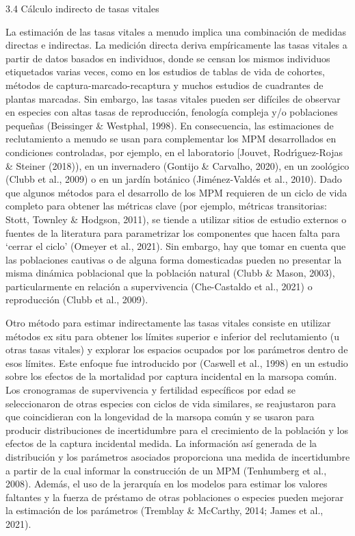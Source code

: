 \documentclass[
  12pt,
  letterpaper,
]{book}
\begin{document}
3.4 \textbar{} Cálculo indirecto de tasas vitales

La estimación de las tasas vitales a menudo implica una combinación de
medidas directas e indirectas. La medición directa deriva empíricamente
las tasas vitales a partir de datos basados en individuos, donde se
censan los mismos individuos etiquetados varias veces, como en los
estudios de tablas de vida de cohortes, métodos de
captura-marcado-recaptura y muchos estudios de cuadrantes de plantas
marcadas. Sin embargo, las tasas vitales pueden ser difíciles de
observar en especies con altas tasas de reproducción, fenología compleja
y/o poblaciones pequeñas (Beissinger \& Westphal, 1998). En
consecuencia, las estimaciones de reclutamiento a menudo se usan para
complementar los MPM desarrollados en condiciones controladas, por
ejemplo, en el laboratorio {[}Jouvet, Rodrı́guez-Rojas \& Steiner
(2018)), en un invernadero (Gontijo \& Carvalho, 2020), en un zoológico
(Clubb et al., 2009) o en un jardín botánico (Jiménez-Valdés et al.,
2010). Dado que algunos métodos para el desarrollo de los MPM requieren
de un ciclo de vida completo para obtener las métricas clave (por
ejemplo, métricas transitorias: Stott, Townley \& Hodgson, 2011), se
tiende a utilizar sitios de estudio externos o fuentes de la literatura
para parametrizar los componentes que hacen falta para `cerrar el ciclo'
(Omeyer et al., 2021). Sin embargo, hay que tomar en cuenta que las
poblaciones cautivas o de alguna forma domesticadas pueden no presentar
la misma dinámica poblacional que la población natural (Clubb \& Mason,
2003), particularmente en relación a supervivencia (Che-Castaldo et al.,
2021) o reproducción (Clubb et al., 2009).

Otro método para estimar indirectamente las tasas vitales consiste en
utilizar métodos ex situ para obtener los límites superior e inferior
del reclutamiento (u otras tasas vitales) y explorar los espacios
ocupados por los parámetros dentro de esos límites. Este enfoque fue
introducido por (Caswell et al., 1998) en un estudio sobre los efectos
de la mortalidad por captura incidental en la marsopa común. Los
cronogramas de supervivencia y fertilidad específicos por edad se
seleccionaron de otras especies con ciclos de vida similares, se
reajustaron para que coincidieran con la longevidad de la marsopa común
y se usaron para producir distribuciones de incertidumbre para el
crecimiento de la población y los efectos de la captura incidental
medida. La información así generada de la distribución y los parámetros
asociados proporciona una medida de incertidumbre a partir de la cual
informar la construcción de un MPM (Tenhumberg et al., 2008). Además, el
uso de la jerarquía en los modelos para estimar los valores faltantes y
la fuerza de préstamo de otras poblaciones o especies pueden mejorar la
estimación de los parámetros (Tremblay \& McCarthy, 2014; James et al.,
2021).
\end{document}
